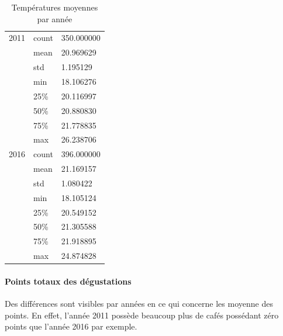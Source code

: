 \begin{table}[H]
	\centering
	\caption{Températures moyennes par année}
	\label{YearlyTmean}
	\begin{tabular}{lll}
		2011 & count                              & 350.000000 \\
		&mean & 20.969629                                      \\
		&std  & 1.195129                                       \\
		&min  & 18.106276                                      \\
		&25\% & 20.116997                                      \\
		&50\% & 20.880830                                      \\
		&75\% & 21.778835                                      \\
		&max  & 26.238706                                      \\
		2016 & count                              & 396.000000 \\
		&mean & 21.169157                                      \\
		&std  & 1.080422                                       \\
		&min  & 18.105124                                      \\
		&25\% & 20.549152                                      \\
		&50\% & 21.305588                                      \\
		&75\% & 21.918895                                      \\
		&max  & 24.874828  
	\end{tabular}
\end{table}

\newpage
\paragraph{Points totaux des dégustations} Des différences sont visibles par années en ce qui concerne les moyenne des points. En effet, l'année 2011 possède beaucoup plus de cafés possédant zéro points que l'année 2016 par exemple.

